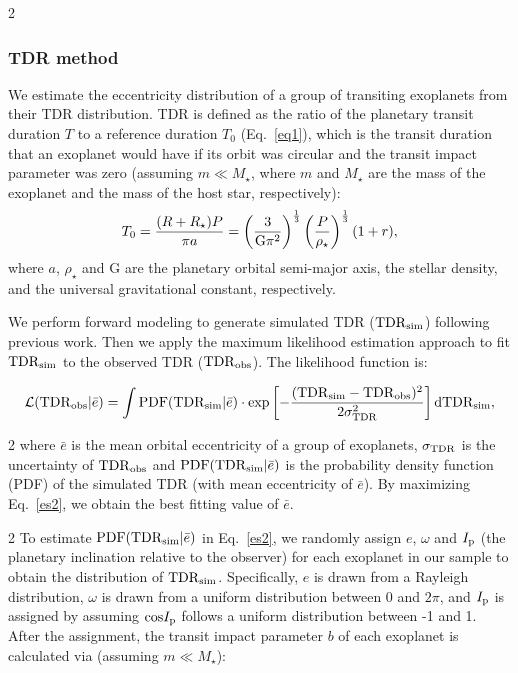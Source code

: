 \documentclass[10pt]{article}
\begin{document}
\begin{multicols}{2}
\subsubsection*{\hypertarget{s1.2}{TDR method}}
\noindent We estimate the eccentricity distribution of a group of transiting exoplanets from their TDR distribution\cite{2008ApJ...678.1407F}.
TDR is defined as the ratio of the planetary transit duration $T$ to a reference duration $T_0$ (Eq.~\ref{eq1}), which is the transit duration that an exoplanet would have if its orbit was circular and the transit impact parameter was zero (assuming $m \ll M_{\star}$, where $m$ and $M_{\star}$ are the mass of the exoplanet and the mass of the host star, respectively):
\begin{equation}
\label{es1}
T_0 = \frac{(R+R_\star) P}{\pi a} = \left(\frac{3}{{\rm G}\pi^2}\right)^{\frac{1}{3}} \left( \frac{P}{\rho_\star} \right)^{\frac{1}{3}}(1 + r),
\end{equation}
where $a$, $\rho_{\star}$ and G are the planetary orbital semi-major axis, the stellar density, and the universal gravitational constant, respectively.

We perform forward modeling to generate simulated TDR (${\rm TDR}_{\rm sim}$) following previous work\cite{2016PNAS..11311431X,2023AJ....165..125A}.
Then we apply the maximum likelihood estimation approach to fit ${\rm TDR}_{\rm sim}$ to the observed TDR (${\rm TDR}_{\rm obs}$).
The likelihood function is:
\end{multicols}

\begin{equation}
\label{es2}
\mathcal{L}({\rm TDR}_{\rm obs} | \bar{e}) = \int {\rm PDF}({\rm TDR}_{\rm sim} | \bar{e}) \cdot {\rm exp} \left[ -\frac{({\rm TDR}_{\rm sim} - {\rm TDR}_{\rm obs})^2}{2 \sigma_{{\rm TDR}}^2} \right] {\rm d} {\rm TDR}_{\rm sim},
\end{equation}

\begin{multicols}{2}
\noindent where $\bar{e}$ is the mean orbital eccentricity of a group of exoplanets, $\sigma_{\rm TDR}$ is the uncertainty of ${\rm TDR}_{\rm obs}$ and ${\rm PDF}({\rm TDR}_{\rm sim} | \bar{e})$ is the probability density function (PDF) of the simulated TDR (with mean eccentricity of $\bar{e}$).
By maximizing Eq.~\ref{es2}, we obtain the best fitting value of $\bar{e}$.
\end{multicols}
\begin{multicols}{2}
To estimate ${\rm PDF}({\rm TDR}_{\rm sim} | \bar{e})$ in Eq.~\ref{es2}, we randomly assign $e$, $\omega$ and $I_{\rm p}$ (the planetary inclination relative to the observer) for each exoplanet in our sample to obtain the distribution of ${\rm TDR}_{\rm sim}$.
Specifically, $e$ is drawn from a Rayleigh distribution, $\omega$ is drawn from a uniform distribution between 0 and $2\pi$, and $I_{\rm p}$ is assigned by assuming ${\rm cos}I_{\rm p}$ follows a uniform distribution between -1 and 1.
After the assignment, the transit impact parameter $b$ of each exoplanet is calculated via (assuming $m \ll M_{\star}$):
\end{multicols}
\end{document}
